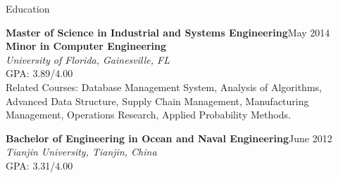 \documentclass{resume} %
\begin{document}
\begin{rSectionNL}{Education}
\begin{rNL}{\rm \textbf{Master of Science in Industrial and Systems Engineering}}{May 2014}{
\rm \textbf{Minor in Computer Engineering} \\ 
\textit{University of Florida, Gainesville, FL} \\ 
GPA: 3.89/4.00 \\
Related Courses: Database Management System, Analysis of Algorithms, Advanced Data Structure, Supply Chain Management, Manufacturing Management, Operations Research, Applied Probability Methods.
}{}
\end{rNL}
 \begin{rNL}{\rm \textbf{Bachelor of Engineering in Ocean and Naval Engineering}}{June 2012}{
 \rm \textit{Tianjin University, Tianjin, China} \\ 
 GPA: 3.31/4.00
 }{}
 \end{rNL}
\end{rSectionNL}
\end{document}
